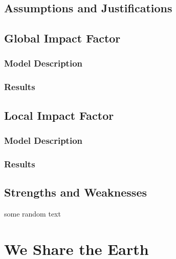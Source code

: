 \documentclass[12pt]{article}
\begin{document}
	\subsection{Assumptions and Justifications}
	
	\subsection{Global Impact Factor}
		
		\subsubsection{Model Description}
		
		\subsubsection{Results}
	
	\subsection{Local Impact Factor}
	
		\subsubsection{Model Description}
		
		\subsubsection{Results}

	\subsection{Strengths and Weaknesses}

	some random text
	
\section*{We Share the Earth}



\newrefcontext[sorting=nyt]
\printbibliography
\end{document}
